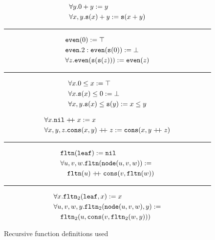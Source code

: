 
\begin{figure}
\begin{minipage}[t]{0.4\textwidth}
	$$\begin{aligned}&\forall y.0+y:=y\\
	&\forall x,y.\mathtt{s}(x)+y:=\mathtt{s}(x+y)\\
	\end{aligned}$$
	\hrule
	$$\begin{aligned}&\mathtt{even}(0):=\top\\
	&\mathtt{even}.2:\mathtt{even}(\mathtt{s}(0)):=\bot\\
	&\forall z.\mathtt{even}(\mathtt{s}(\mathtt{s}(z))):=\mathtt{even}(z)\\
	\end{aligned}$$
	\hrule
	$$\begin{aligned}&\forall x.0\leq x:=\top\\
	&\forall x.\mathtt{s}(x)\leq 0:=\bot\\
	&\forall x,y.\mathtt{s}(x)\leq \mathtt{s}(y):=x\leq y\\
	\end{aligned}$$
\end{minipage}
\begin{minipage}[t]{0.5\textwidth}
	$$\begin{aligned}&\forall x.\mathtt{nil}\mathrel{ +\hspace{-1mm}+ } x:=x\\
	&\forall x,y,z.\mathtt{cons}(x,y)\mathrel{ +\hspace{-1mm}+ } z:=\mathtt{cons}(x,y\mathrel{ +\hspace{-1mm}+ } z)\\
	\end{aligned}$$
	\hrule
	$$\begin{aligned}
	&\mathtt{fltn}(\mathtt{leaf}):=\mathtt{nil}\\
	&\forall u,v,w.\mathtt{fltn}(\mathtt{node}(u,v,w)):=\\&\quad\mathtt{fltn}(u)\mathrel{ +\hspace{-1mm}+ }\mathtt{cons}(v,\mathtt{fltn}(w))
	\end{aligned}$$
	\hrule
	$$\begin{aligned}
	&\forall x.\mathtt{fltn}_2(\mathtt{leaf},x):=x\\
	&\forall u,v,w,y.\mathtt{fltn}_2(\mathtt{node}(u,v,w),y):=\\&\quad\mathtt{fltn}_2(u,\mathtt{cons}(v,\mathtt{fltn}_2(w,y)))
	\end{aligned}$$
\end{minipage}
\caption{Recursive function definitions used}
\label{fig:functions}
\end{figure}

